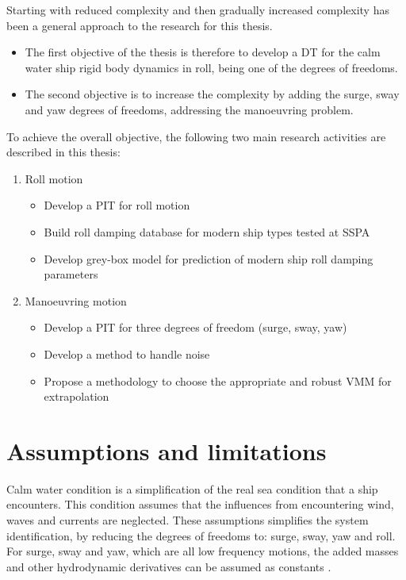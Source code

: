 Starting with reduced complexity and then gradually increased complexity has been a general approach to the research for this thesis.   

\begin{itemize}
\item The first objective of the thesis is therefore to develop a DT for the calm water ship rigid body dynamics in roll, being one of the degrees of freedoms.
\item The second objective is to increase the complexity by adding the surge, sway and yaw degrees of freedoms, addressing the manoeuvring problem.
\end{itemize}

\bigbreak
\noindent To achieve the overall objective, the following two main research activities are described in this thesis:
\begin{enumerate}

    \item Roll motion
    \begin{itemize}
        \item Develop a PIT for roll motion
        \item Build roll damping database for modern ship types tested at SSPA
        \item Develop grey-box model for prediction of modern ship roll damping parameters
    \end{itemize}
    
    \item Manoeuvring motion
    \begin{itemize}
        \item Develop a PIT for three degrees of freedom (surge, sway, yaw)
        \item Develop a method to handle noise
        \item Propose a methodology to choose the appropriate and robust VMM for extrapolation
 
    \end{itemize}
\end{enumerate}

\section{Assumptions and limitations}
Calm water condition is a simplification of the real sea condition that a ship encounters. This condition assumes that the influences from encountering wind, waves and currents are neglected. These assumptions simplifies the system identification, by reducing the degrees of freedoms to: surge, sway, yaw and roll. For surge, sway and yaw, which are all low frequency motions, the added masses and other hydrodynamic derivatives can be assumed as constants \cite{fossen_handbook_2021}.  

